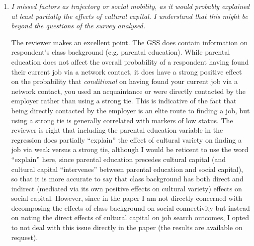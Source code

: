 \documentclass[11pt]{article}
\begin{document}
\begin{enumerate}
	I agree with the reviewer that entering into the omnivore debate would take this paper too far afield.  This is why I decided to concentrate on the more neutral term ``cultural variety'' which we owe to Erickson (1996).  I can see how splitting the activities by ``brow-level'' might reveal some important insights, but I decided against it because it would make the analysis too complicated.  I would be more open however if the reviewer were to specify a more theoretically driven reason for doing this.  In the absence of strong theory, I opted to go with the simplest way of characterizing the cultural capital variable which is the volume measure.  Note that I do disaggregate the activities when looking at differences between those who used acquaintances and those who were contacted directly by their employer and this analysis demonstrates that these are two very different types of culture consumers however.  
	
	\item \emph{I missed factors as trajectory or social mobility, as it would probably explained at least partially the effects of cultural capital. I understand that this might be beyond the questions of the survey analysed.}
	
The reviewer makes an excellent point.  The GSS does contain information on respondent's class background (e.g. parental education).   While parental education does not affect the overall probability of a respondent having found their current job via a network contact, it does have a strong positive effect on the probability that \emph{conditional} on having found your current job via a network contact, you used an acquaintance or were directly contacted by the employer rather than using a strong tie.  This is indicative of the fact that being directly contacted by the employer is an elite route to finding a job, but using a strong tie is generally correlated with markers of low status. The reviewer is right that including the parental education variable in the regression does partially ``explain'' the effect of cultural variety on finding a job via weak versus a strong tie, although I would be reticent to use the word ``explain'' here, since parental education precedes cultural capital (and cultural capital ``intervenes'' between parental education and social capital), so that it is more accurate to say that class background has both direct and indirect (mediated via its own positive effects on cultural variety) effects on social capital.  However, since in the paper I am not directly concerned with decomposing the effects of class background on social connectivity but instead on noting the direct effects of cultural capital on job search outcomes, I opted to not deal with this issue directly in the paper (the results are available on request).
\end{enumerate}
\end{document}
